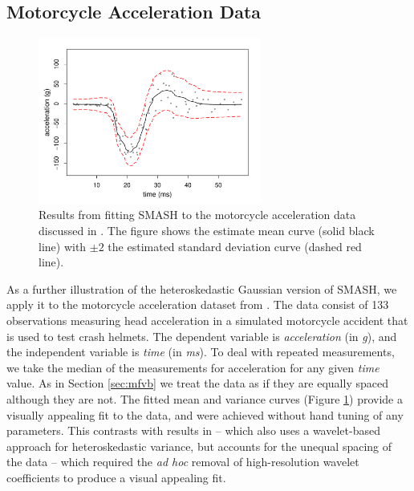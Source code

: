\documentclass[12pt]{article}
\begin{document}
\subsection{Motorcycle Acceleration Data}
\begin{figure}
\centering
    \includegraphics[width=0.65\textwidth]{motorcycle.pdf}
    \caption{Results from fitting SMASH to the motorcycle acceleration data discussed in \cite{silverman1985some}. The figure shows the estimate mean curve (solid black line) with $\pm2$ the estimated standard deviation curve (dashed red line).}
    \label{fig:motorcycle}
\end{figure}

As a further illustration of the heteroskedastic Gaussian version of SMASH, we apply it to the motorcycle acceleration dataset from \cite{silverman1985some}. The data consist of 133 observations measuring head acceleration in a simulated motorcycle accident that is used to test crash helmets. The dependent variable is {\it acceleration} (in {\it g}), and the independent variable is {\it time} (in {\it ms}). To deal with repeated measurements, we take the median of the measurements for acceleration for any given {\it time} value. As in Section \ref{sec:mfvb} we treat the 
data as if they are equally spaced although they are not. The fitted mean and variance curves (Figure \ref{fig:motorcycle})  
provide a visually appealing fit to the data, and were achieved without hand tuning of any parameters. This contrasts with
results in \cite{Delouille2004Smooth} -- which also uses a wavelet-based approach for heteroskedastic variance, but accounts for the unequal spacing of the data -- which required the {\it ad hoc} removal of high-resolution wavelet coefficients to produce a visual appealing fit.



\end{document}
